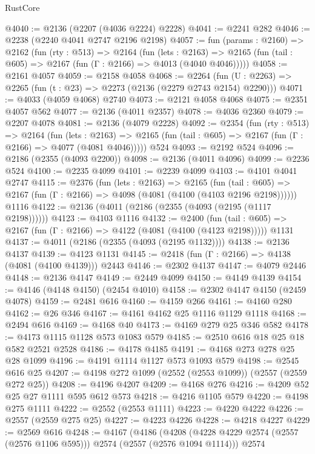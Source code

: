 \begin{lexlean}{RustCore}
\begin{coremodule}
@4040 := @2136 (@2207 (@4036 @2224) @2228)
@4041 := @2241 @282
@4046 := @2238 (@2240 @4041 @2747 @2196 @2198)
@4057 := fun (params : @2160) =>
  @2162
    (fun (rty : @513) =>
    @2164
      (fun (lets : @2163) =>
      @2165 (fun (tail : @605) => @2167 (fun (Γ : @2166) => @4013 (@4040 @4046)))))
@4058 := @2161 @4057
@4059 := @2158 @4058
@4068 := @2264 (fun (U : @2263) => @2265 (fun (t : @23) => @2273 (@2136 (@2279 @2743 @2154) @2290)))
@4071 := @4033 (@4059 @4068) @2740
@4073 := @2121 @4058 @4068
@4075 := @2351 @4057 @562
@4077 := @2136 (@4011 @2357)
@4078 := @4036 @2360
@4079 := @2207 @4078
@4081 := @2136 (@4079 @2228)
@4092 := @2354
    (fun (rty : @513) =>
    @2164
      (fun (lets : @2163) =>
      @2165 (fun (tail : @605) => @2167 (fun (Γ : @2166) => @4077 (@4081 @4046)))))
    @524
@4093 := @2192 @524
@4096 := @2186 (@2355 (@4093 @2200))
@4098 := @2136 (@4011 @4096)
@4099 := @2236 @524
@4100 := @2235 @4099
@4101 := @2239 @4099
@4103 := @4101 @4041 @2747
@4115 := @2376
    (fun (lets : @2163) =>
    @2165
      (fun (tail : @605) => @2167 (fun (Γ : @2166) => @4098 (@4081 (@4100 (@4103 @2196 @2198))))))
    @1116
@4122 := @2136 (@4011 (@2186 (@2355 (@4093 (@2195 (@1117 @2198))))))
@4123 := @4103 @1116
@4132 := @2400
    (fun (tail : @605) => @2167 (fun (Γ : @2166) => @4122 (@4081 (@4100 (@4123 @2198)))))
    @1131
@4137 := @4011 (@2186 (@2355 (@4093 (@2195 @1132))))
@4138 := @2136 @4137
@4139 := @4123 @1131
@4145 := @2418 (fun (Γ : @2166) => @4138 (@4081 (@4100 @4139))) @2443
@4146 := @2302 @4137
@4147 := @4079 @2446
@4148 := @2136 @4147
@4149 := @2449 @4099
@4150 := @4149 @4139
@4154 := @4146 (@4148 @4150) (@2454 @4010)
@4158 := @2302 @4147 @4150 (@2459 @4078)
@4159 := @2481 @616
@4160 := @4159 @266
@4161 := @4160 @280
@4162 := @26 @346
@4167 := @4161 @4162 @25 @1116 @1129 @1118
@4168 := @2494 @616
@4169 := @4168 @40
@4173 := @4169 @279 @25 @346 @582
@4178 := @4173 @1115 @1128 @573 @1083 @579
@4185 := @2510 @616 @18 @25 @18 @582 @2521 @2528
@4186 := @4178 @4185
@4191 := @4168 @273 @278 @25 @28 @1099
@4196 := @4191 @1114 @1127 @573 @1093 @579
@4198 := @2545 @616 @25
@4207 := @4198 @272 @1099 (@2552 (@2553 @1099)) (@2557 (@2559 @272 @25))
@4208 := @4196 @4207
@4209 := @4168 @276
@4216 := @4209 @52 @25 @27 @1111 @595 @612 @573
@4218 := @4216 @1105 @579
@4220 := @4198 @275 @1111
@4222 := @2552 (@2553 @1111)
@4223 := @4220 @4222
@4226 := @2557 (@2559 @275 @25)
@4227 := @4223 @4226
@4228 := @4218 @4227
@4229 := @2569 @616
@4248 := @4167
    (@4186
      (@4208 (@4228 @4229 @2574 (@2557 (@2576 @1106 @595))) @2574 (@2557 (@2576 @1094 @1114)))
      @2574

\end{coremodule}
\end{lexlean}

